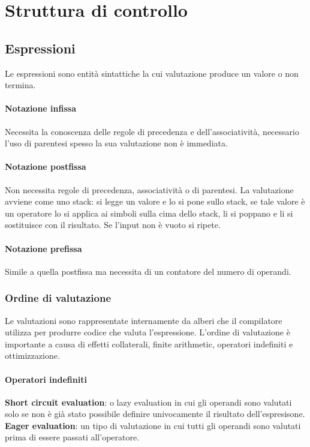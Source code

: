 \chapter{Struttura di controllo}
\section{Espressioni}
Le espressioni sono entit\`a sintattiche la cui valutazione produce un valore o non termina.
\subsubsection{Notazione infissa}
Necessita la conoscenza delle regole di precedenza e dell'associativit\`a, necessario l'uso di parentesi spesso la sua valutazione non \`e immediata.
\subsubsection{Notazione postfissa}
Non necessita regole di precedenza, associativit\`a o di parentesi. La valutazione avviene come uno stack: si legge un valore e lo si pone sullo stack, se tale valore \`e un 
operatore lo si applica ai simboli sulla cima dello stack, li si poppano e li si sostituisce con il risultato. Se l'input non \`e vuoto si ripete.
\subsubsection{Notazione prefissa}
Simile a quella postfissa ma necessita di un contatore del numero di operandi.
\subsection{Ordine di valutazione}
Le valutazioni sono rappresentate internamente da alberi che il compilatore utilizza per produrre codice che valuta l'espressione. L'ordine di valutazione \`e importante a causa
di effetti collaterali, finite arithmetic, operatori indefiniti e ottimizzazione. 
\subsubsection{Operatori indefiniti}
\textbf{Short circuit evaluation}: o lazy evaluation in cui gli operandi sono valutati solo se non \`e gi\`a stato possibile definire univocamente il risultato dell'espresisone.\\\textbf{Eager evaluation}: un tipo di valutazione in cui tutti gli operandi sono valutati prima di essere passati all'operatore. 
